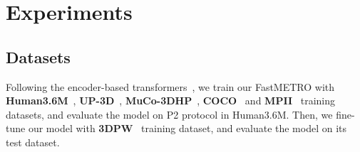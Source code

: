 \section{Experiments}

\subsection{Datasets}
Following the encoder-based transformers~\cite{lin2021metro,lin2021graphormer}, we train our FastMETRO with \textbf{Human3.6M}~\cite{wang2014h36m}, \textbf{UP-3D}~\cite{lassner2017up3d}, \textbf{MuCo-3DHP}~\cite{mehta2018muco}, \textbf{COCO}~\cite{lin2014coco} and \textbf{MPII}~\cite{mykhaylo2014mpii} training datasets, and evaluate the model on P2 protocol in Human3.6M.
Then, we fine-tune our model with \textbf{3DPW}~\cite{marcard20183dpw} training dataset, and evaluate the model on its test dataset.

